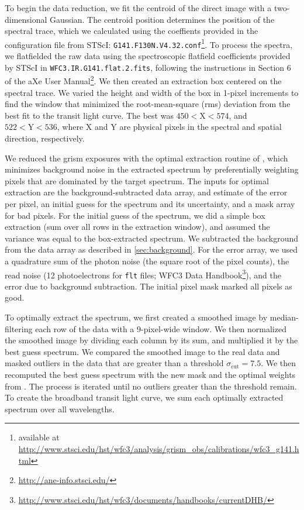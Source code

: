 \documentclass[twocolumn]{aastex62}
\begin{document}
To begin the data reduction, we fit the centroid of the direct image with a two-dimensional Gaussian. The centroid position determines the position of the spectral trace, which we calculated using the coeffients provided in the configuration file from STScI: \texttt{G141.F130N.V4.32.conf}\footnote{available at \url{http://www.stsci.edu/hst/wfc3/analysis/grism_obs/calibrations/wfc3_g141.html}}.  To process the spectra, we flatfielded the raw data using the spectroscopic flatfield coefficients provided by STScI in \texttt{WFC3.IR.G141.flat.2.fits}, following the instructions in Section 6 of the aXe User Manual\footnote{\url{http://ane-info.stsci.edu/}}.  We then created an extraction box centered on the spectral trace. We varied the height and width of the box in 1-pixel increments to find the window that minimized the root-mean-square (rms) deviation from the best fit to the transit light curve.  The best was $450  < \mathrm{X} < 574$, and $522 < \mathrm{Y} < 536$, where X and Y are physical pixels in the spectral and spatial direction, respectively. 

We reduced the grism exposures with the optimal extraction routine of \cite{horne86}, which minimizes background noise in the extracted spectrum by preferentially weighting pixels that are dominated by the target spectrum.  The inputs for optimal extraction are the background-subtracted data array, and estimate of the error per pixel, an initial guess for the spectrum and its uncertainty, and a mask array for bad pixels.  For the initial guess of the spectrum, we did a simple box extraction (sum over all rows in the extraction window), and assumed the variance was equal to the box-extracted spectrum.  We subtracted the background from the data array as described in \ref{sec:background}. For the error array, we used a quadrature sum of the photon noise (the square root of the pixel counts), the read noise (12 photoelectrons for \texttt{flt} files; WFC3 Data Handbook\footnote{\url{http://www.stsci.edu/hst/wfc3/documents/handbooks/currentDHB/}}), and the error due to background subtraction. The initial pixel mask marked all pixels as good. 

To optimally extract the spectrum,  we first created a smoothed image by median-filtering each row of the data with a 9-pixel-wide window.  We then normalized the smoothed image by dividing each column by its sum, and multiplied it by the best guess spectrum. We compared the smoothed image to the real data and masked outliers in the data that are greater than a threshold $\sigma_\mathrm{cut} = 7.5$. We then recomputed the best guess spectrum with the new mask and the optimal weights from \cite{horne86}. The process is iterated until no outliers greater than the threshold remain.  To create the broadband transit light curve, we sum each optimally extracted spectrum over all wavelengths. 
\end{document}
